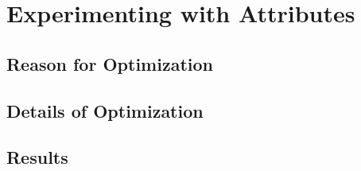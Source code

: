 
\section{Experimenting with Attributes}
\label{sec-opts-attr}

\subsection{Reason for Optimization}

\subsection{Details of Optimization}

\subsection{Results}

\clearpage
